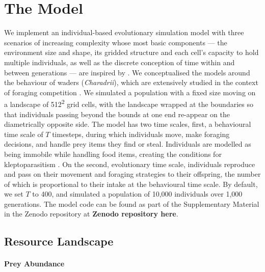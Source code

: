 \documentclass[11pt]{article}
\begin{document}
\section{The Model}

We implement an individual-based evolutionary simulation model with three scenarios of increasing complexity whose most basic components --- the environment size and shape, its gridded structure and each cell's capacity to hold multiple individuals, as well as the discrete conception of time within and between generations --- are inspired by \citet{netz2020}.
We conceptualised the models around the behaviour of waders (\textit{Charadrii}), which are extensively studied in the context of foraging competition \citep[e.g.][]{vahl2005, vahl2005a, vahl2007, rutten2010a, rutten2010}.
We simulated a population with a fixed size moving on a landscape of 512\textsuperscript{2} grid cells, with the landscape wrapped at the boundaries so that individuals passing beyond the bounds at one end re-appear on the diametrically opposite side.
The model has two time scales, first, a behavioural time scale of $T$ timesteps, during which individuals move, make foraging decisions, and handle prey items they find or steal.
Individuals are modelled as being immobile while handling food items, creating the conditions for kleptoparasitism \citep{brockmann1979}.
On the second, evolutionary time scale, individuals reproduce and pass on their movement and foraging strategies to their offspring, the number of which is proportional to their intake at the behavioural time scale.
By default, we set $T$ to 400, and simulated a population of 10,000 individuals over 1,000 generations.
The model code can be found as part of the Supplementary Material in the Zenodo repository at \textbf{Zenodo repository here}.

\subsection{Resource Landscape}

\paragraph{Prey Abundance}
\end{document}
